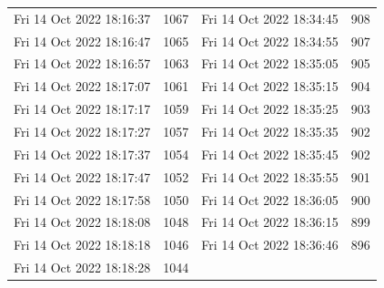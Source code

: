 \documentclass[12pt]{ctexart}
\numberwithin{equation}{section}
\begin{document}
\begin{longtable}{cc|cc}
Fri 14 Oct 2022 18:16:37 & 1067 & Fri 14 Oct 2022 18:34:45 & 908 \\
Fri 14 Oct 2022 18:16:47 & 1065 & Fri 14 Oct 2022 18:34:55 & 907 \\
Fri 14 Oct 2022 18:16:57 & 1063 & Fri 14 Oct 2022 18:35:05 & 905 \\
Fri 14 Oct 2022 18:17:07 & 1061 & Fri 14 Oct 2022 18:35:15 & 904 \\
Fri 14 Oct 2022 18:17:17 & 1059 & Fri 14 Oct 2022 18:35:25 & 903 \\
Fri 14 Oct 2022 18:17:27 & 1057 & Fri 14 Oct 2022 18:35:35 & 902 \\
Fri 14 Oct 2022 18:17:37 & 1054 & Fri 14 Oct 2022 18:35:45 & 902 \\
Fri 14 Oct 2022 18:17:47 & 1052 & Fri 14 Oct 2022 18:35:55 & 901 \\
Fri 14 Oct 2022 18:17:58 & 1050 & Fri 14 Oct 2022 18:36:05 & 900 \\
Fri 14 Oct 2022 18:18:08 & 1048 & Fri 14 Oct 2022 18:36:15 & 899 \\
Fri 14 Oct 2022 18:18:18 & 1046 & Fri 14 Oct 2022 18:36:46 & 896 \\
Fri 14 Oct 2022 18:18:28 & 1044 \\
    \hline
\end{longtable}

\pagebreak
\end{document}

